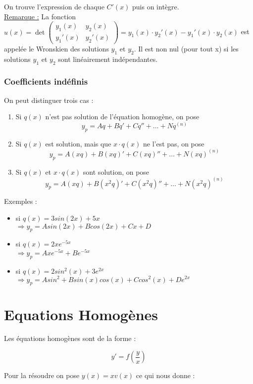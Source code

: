 \documentclass[12pt,a4paper]{report}
\begin{document}
On trouve l'expression de chaque $C'(x)$ puis on intègre.\\

\underline{Remarque :} La fonction $u(x)=\det\begin{pmatrix}
y_1(x) & y_2(x) \\
y_1'(x) & y_2'(x) 
\end{pmatrix}=y_1(x)\cdot y_2'(x)-y_1'(x)\cdot y_2(x)$ est appelée le Wronskien des solutions $y_1$ et $y_2$. Il est non nul (pour tout x) si les solutions $y_1$ et $y_2$ sont linéairement indépendantes.

\subsubsection{Coefficients indéfinis}

On peut distinguer trois cas :
\begin{enumerate}
\item Si $q(x)$ n'est pas solution de l'équation homogène, on pose $$y_p = Aq + Bq'+Cq''+\hdots + Nq^{(n)}$$
\item Si $q(x)$ est solution, mais que $x\cdot q(x)$ ne l'est pas, on pose $$y_p = A(xq) + B(xq)'+C(xq)''+\hdots + N(xq)^{(n)}$$
\item Si $q(x)$ et $x\cdot q(x)$ sont solution, on pose $$y_p = A(xq) + B(x^2q)'+C(x^2q)''+\hdots + N(x^2q)^{(n)}$$
\end{enumerate}

Exemples : \\
\begin{itemize}
\item si $q(x) = 3sin(2x) + 5x$\\
$\Rightarrow  y_p = Asin(2x) + Bcos(2x) + Cx + D$
\item si $q(x) = 2xe^{-5x}$\\
$\Rightarrow y_p = Axe^{-5x} + Be^{-5x}$
\item si $q(x) = 2sin^2(x)+3e^{2x}$ \\
$\Rightarrow y_p = Asin^2 + Bsin(x)cos(x) + Ccos^2(x) + De^{2x}$
\end{itemize}

\section{Equations Homogènes}

Les équations homogènes sont de la forme :

$$y' = f(\frac{y}{x})$$

Pour la résoudre on pose $y(x) = xv(x)$ ce qui nous donne :
\end{document}
